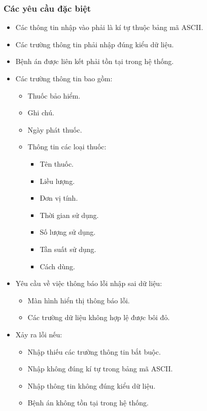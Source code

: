 \subsubsection{Các yêu cầu đặc biệt}
\begin{itemize}
  \item Các thông tin nhập vào phải là kí tự thuộc bảng mã ASCII.
  \item Các trường thông tin phải nhập đúng kiểu dữ liệu.
  \item Bệnh án được liên kết phải tồn tại trong hệ thống.
  \item Các trường thông tin bao gồm:
  \begin{itemize}
    \item Thuốc bảo hiểm.
    \item Ghi chú.
    \item Ngày phát thuốc.
    \item Thông tin các loại thuốc:
    \begin{itemize}
      \item Tên thuốc.
      \item Liều lượng.
      \item Đơn vị tính.
      \item Thời gian sử dụng.
      \item Số lượng sử dụng.
      \item Tần suất sử dụng.
      \item Cách dùng.
    \end{itemize}
  \end{itemize}
  \item Yêu cầu về việc thông báo lỗi nhập sai dữ liệu:
  \begin{itemize}
    \item Màn hình hiển thị thông báo lỗi.
    \item Các trường dữ liệu không hợp lệ được bôi đỏ.
  \end{itemize}
  \item Xảy ra lỗi nếu:
  \begin{itemize}
    \item Nhập thiếu các trường thông tin bắt buộc.
    \item Nhập không đúng kí tự trong bảng mã ASCII.
    \item Nhập thông tin không đúng kiểu dữ liệu.
    \item Bệnh án không tồn tại trong hệ thống.
  \end{itemize}
\end{itemize}


